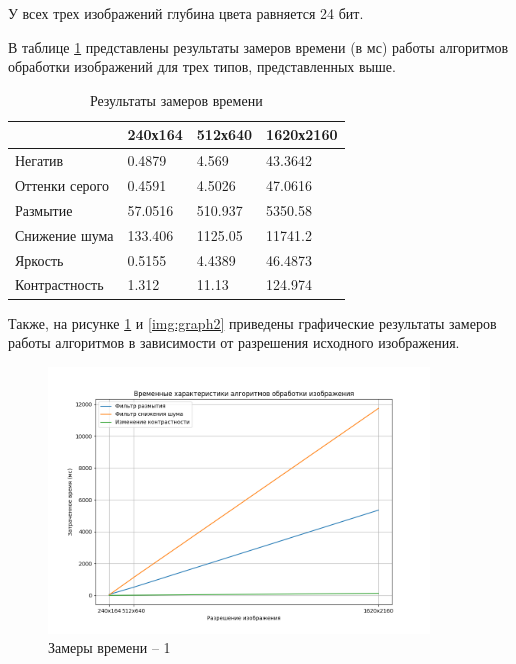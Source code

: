 У всех трех изображений глубина цвета равняется 24 бит.

В таблице \ref{resTime} представлены результаты замеров времени (в мс) работы алгоритмов обработки изображений для трех типов, представленных выше.

\begin{table}[hbtp]
	\centering
	\begin{tabular}{|l||l|l|l|}
		\hline
		 & 240х164 & 512х640 & 1620х2160 \\
		\hline\hline 
		Негатив & 0.4879 & 4.569 & 43.3642 \\ \hline
		Оттенки	 серого & 0.4591 & 4.5026 & 47.0616 \\ \hline
		Размытие & 57.0516 & 510.937 & 5350.58 \\ \hline
		Снижение шума & 133.406 & 1125.05 & 11741.2 \\ \hline
		Яркость & 0.5155 & 4.4389 & 46.4873 \\ \hline
		Контрастность & 1.312 & 11.13 & 124.974 \\ \hline
	\end{tabular}
	\caption{\label{resTime} Результаты замеров времени}
\end{table}

Также, на рисунке \ref{img:graph1} и \ref{img:graph2} приведены графические результаты замеров работы алгоритмов в зависимости от разрешения исходного изображения.

\begin{figure}[hbtp]
	\centering
	\includegraphics[width=0.9\textwidth]{img/graph1.png}
	\caption{\label{img:graph1} Замеры времени -- 1}
\end{figure}

